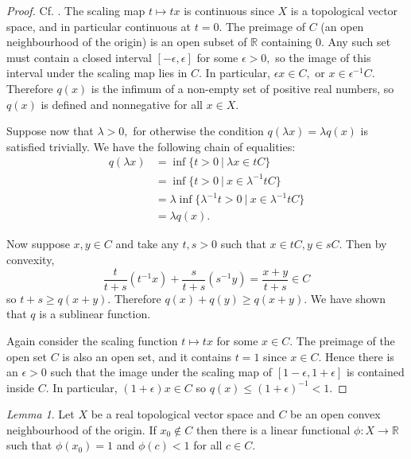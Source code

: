 \documentclass[BSc]{usydthesis}
\numberwithin{equation}{chapter}
\theoremstyle{remark}
\newtheorem{Lemma}[equation]{Lemma}
\newcommand{\R}{\mathbb{R}}
\begin{document}
\begin{proof} Cf. \cite[page 108]{Conway}. The scaling map $t\mapsto tx$ is continuous since $X$ is a topological vector space, and in particular continuous at $t=0.$ The preimage of $C$ (an open neighbourhood of the origin) is an open subset of $\R$ containing $0.$ Any such set must contain a closed interval $[-\epsilon, \epsilon]$ for some $\epsilon>0,$ so the image of this interval under the scaling map lies in $C.$ In particular, $\epsilon x \in C,$ or $x\in \epsilon^{-1} C.$ Therefore $q(x)$ is the infimum of a non-empty set of positive real numbers, so $q(x)$ is defined and nonnegative for all $x\in X.$ 

Suppose now that $\lambda >0,$ for otherwise the condition $q(\lambda x)=\lambda q(x)$ is satisfied trivially. We have the following chain of equalities:
\begin{align*}
q(\lambda x) &= \inf \{ t>0 \ | \ \lambda x \in tC \} \\
            &= \inf \{ t>0 \ | \  x \in \lambda^{-1}tC \} \\
						&= \lambda \inf \{ \lambda^{-1} t>0 \ | \  x \in \lambda^{-1}tC \} \\
						&= \lambda q(x).
\end{align*}

Now suppose $x,y\in C$ and take any $t,s>0$ such that $x\in tC, y\in sC.$ Then by convexity, $$ \frac{t}{t+s} (t^{-1}x) + \frac{s}{t+s} (s^{-1}y) = \frac{x+y}{t+s} \in C$$ so $t+s \geq q(x+y).$ Therefore $q(x)+q(y) \geq q(x+y).$ We have shown that $q$ is a sublinear function. 

Again consider the scaling function $t\mapsto tx$ for some $x\in C.$ The preimage of the open set $C$ is also an open set, and it contains $t=1$ since $x\in C.$ Hence there is an $\epsilon>0$ such that the image under the scaling map of $[1-\epsilon, 1+\epsilon]$ is contained inside $C.$ In particular, $(1+\epsilon) x \in C$ so $q(x) \leq (1+\epsilon)^{-1}<1.$ 
\end{proof}


\begin{Lemma} \label{A} Let $X$ be a real topological vector space and $C$ be an open convex neighbourhood of the origin. If $x_0\notin C$ then there is a linear functional $\phi:X \to \R$ such that $\phi(x_0)=1$ and $\phi(c)<1$ for all $c\in C.$ 
\end{Lemma}
\end{document}

